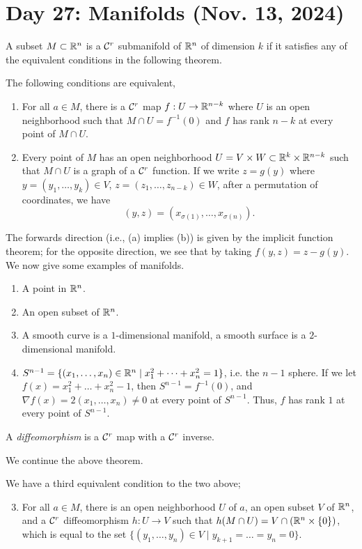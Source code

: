 \section{Day 27: Manifolds (Nov. 13, 2024)}
A subset $M \subset \mathbb R^n$ is a $\mathcal C^r$ submanifold of $\mathbb R^n$ of dimension $k$ if it satisfies any of the equivalent conditions in the following theorem.
\begin{simplethm}
    The following conditions are equivalent,
    \begin{enumerate}[label=(\alph*)]
        \item For all $a \in M$, there is a $\mathcal C^r$ map $f : U \to \mathbb R^{n-k}$ where $U$ is an open neighborhood such that $M \cap U = f^{-1}(0)$ and $f$ has rank $n-k$ at every point of $M \cap U$.
        \item Every point of $M$ has an open neighborhood $U = V \times W \subset \mathbb R^{k} \times \mathbb R^{n-k}$ such that $M \cap U$ is a graph of a $\mathcal C^r$ function. If we write $z = g(y)$ where $y = (y_1, \dots, y_k) \in V$, $z = (z_1, \dots, z_{n-k}) \in W$, after a permutation of coordinates, we have
        \[ (y, z) = (x_{\sigma(1)}, \dots, x_{\sigma(n)}). \]
    \end{enumerate}
\end{simplethm}
\noindent The forwards direction (i.e., (a) implies (b)) is given by the implicit function theorem; for the opposite direction, we see that by taking $f(y, z) = z - g(y)$.
\medskip\newline
We now give some examples of manifolds.
\begin{enumerate}[label=(\alph*)]
    \item A point in $\mathbb R^n$.
    \item An open subset of $\mathbb R^n$.
    \item A smooth curve is a $1$-dimensional manifold, a smooth surface is a $2$-dimensional manifold.
    \item $S^{n-1} = \{(x_1, \dots, x_n) \in \mathbb R^n \mid x_1^2 + \dots + x_n^2 = 1\}$, i.e. the $n-1$ sphere. If we let $f(x) = x_1^2 + \dots + x_n^2 - 1$, then $S^{n-1} = f^{-1}({0})$, and $\nabla f(x) = 2(x_1, \dots, x_n) \neq 0$ at every point of $S^{n-1}$. Thus, $f$ has rank $1$ at every point of $S^{n-1}$.
\end{enumerate}
\begin{definition}
    A \textit{diffeomorphism} is a $\mathcal C^r$ map with a $\mathcal C^r$ inverse.
\end{definition}
\noindent We continue the above theorem.
\begin{simplethm}
    We have a third equivalent condition to the two above;
    \begin{enumerate}[label=(\alph*)]
        \setcounter{enumi}{2}
        \item For all $a \in M$, there is an open neighborhood $U$ of $a$, an open subset $V$ of $\mathbb R^n$, and a $\mathcal C^r$ diffeomorphism $h : U \to V$ such that $h(M \cap U) = V \cap (\mathbb R^n \times \{0\})$, which is equal to the set $\{(y_1, \dots, y_n) \in V \mid y_{k+1} = \dots = y_n = 0 \}$.
    \end{enumerate}
\end{simplethm}
